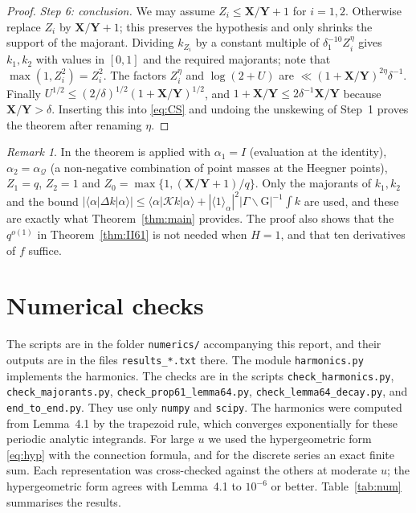 \documentclass[11pt]{amsart}
\theoremstyle{remark}
\newtheorem{remark}[theorem]{Remark}
\theoremstyle{definition}
\numberwithin{equation}{section}
\newcommand{\G}{\mathrm{G}}
\newcommand{\br}[1]{\langle #1\rangle}
\newcommand{\bX}{\mathbf{X}}
\newcommand{\bY}{\mathbf{Y}}
\newcommand{\Kc}{\mathcal{K}}
\begin{document}
\begin{proof}
\emph{Step 6: conclusion.} We may assume $Z_i\le\bX/\bY+1$ for $i=1,2$. Otherwise replace $Z_i$ by $\bX/\bY+1$; this preserves the hypothesis and only shrinks the support of the majorant. Dividing $k_{Z_i}$ by a constant multiple of $\delta_1^{-10}Z_i^\eta$ gives $k_1,k_2$ with values in $[0,1]$ and the required majorants; note that $\max(1,Z_i^2)=Z_i^2$. The factors $Z_i^{\eta}$ and $\log(2+U)$ are $\ll(1+\bX/\bY)^{2\eta}\delta^{-1}$. Finally $U^{1/2}\le(2/\delta)^{1/2}(1+\bX/\bY)^{1/2}$, and $1+\bX/\bY\le2\delta^{-1}\bX/\bY$ because $\bX/\bY>\delta$. Inserting this into \eqref{eq:CS} and undoing the unskewing of Step~1 proves the theorem after renaming $\eta$.
\end{proof}

\begin{remark}\label{rem:use}
In \cite{II} the theorem is applied with $\alpha_1=I$ (evaluation at the identity), $\alpha_2=\alpha_{\mathcal Q}$ (a non-negative combination of point masses at the Heegner points), $Z_1=q$, $Z_2=1$ and $Z_0=\max\{1,(\bX/\bY+1)/q\}$. Only the majorants of $k_1,k_2$ and the bound $|\br{\alpha|\Delta k|\alpha}|\le\br{\alpha|\Kc k|\alpha}+|\br1_\alpha|^2|\Gamma\backslash\G|^{-1}\int k$ are used, and these are exactly what Theorem~\ref{thm:main} provides. The proof also shows that the $q^{o(1)}$ in Theorem~\ref{thm:II61} is not needed when $H=1$, and that ten derivatives of $f$ suffice.
\end{remark}

\section{Numerical checks}\label{sec:numerics}
The scripts are in the folder \texttt{numerics/} accompanying this report, and their outputs are in the files \texttt{results\_*.txt} there. The module \texttt{harmonics.py} implements the harmonics. The checks are in the scripts \texttt{check\_harmonics.py}, \texttt{check\_majorants.py}, \texttt{check\_prop61\_lemma64.py}, \texttt{check\_lemma64\_decay.py}, and \texttt{end\_to\_end.py}. They use only \texttt{numpy} and \texttt{scipy}. The harmonics were computed from Lemma~4.1 by the trapezoid rule, which converges exponentially for these periodic analytic integrands. For large $u$ we used the hypergeometric form \eqref{eq:hyp} with the connection formula, and for the discrete series an exact finite sum. Each representation was cross-checked against the others at moderate $u$; the hypergeometric form agrees with Lemma~4.1 to $10^{-6}$ or better. Table~\ref{tab:num} summarises the results.
\end{document}
